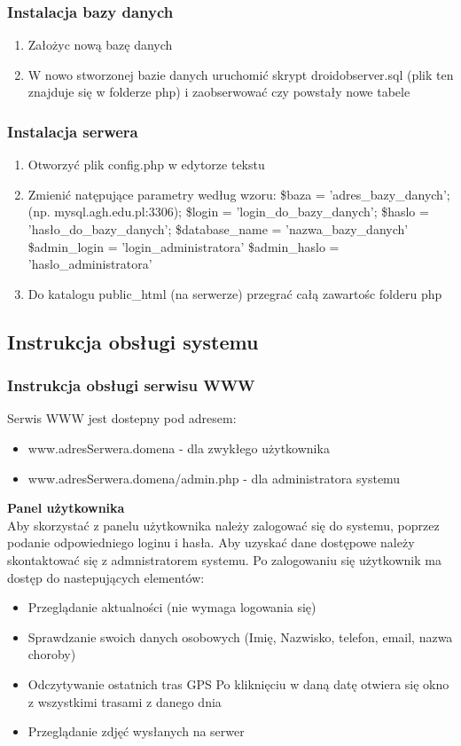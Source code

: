 \documentclass[11pt,a4paper]{article}
\begin{document}
\subsubsection{Instalacja bazy danych}
\begin{enumerate}
\item Założyc nową bazę danych
\item W nowo stworzonej bazie danych uruchomić skrypt droidobserver.sql (plik ten znajduje się w folderze php) i zaobserwować czy powstały nowe tabele
\end{enumerate}

\subsubsection{Instalacja serwera}
\begin{enumerate}
\item Otworzyć plik config.php w edytorze tekstu
\item Zmienić natępujące parametry według wzoru:
\subitem \$baza = 'adres\_bazy\_danych';  (np. mysql.agh.edu.pl:3306);
\subitem \$login = 'login\_do\_bazy\_danych'; 
\subitem \$haslo = 'hasło\_do\_bazy\_danych';
\subitem \$database\_name = 'nazwa\_bazy\_danych'
\subitem \$admin\_login = 'login\_administratora'
\subitem \$admin\_haslo = 'haslo\_administratora'
\item Do katalogu public\_html (na serwerze) przegrać całą zawartośc folderu php
\end{enumerate}

\subsection{Instrukcja obsługi systemu}
\subsubsection{Instrukcja obsługi serwisu WWW}

Serwis WWW jest dostepny pod adresem:
\begin{itemize}
\item www.adresSerwera.domena - dla zwykłego użytkownika 
\item www.adresSerwera.domena/admin.php - dla administratora systemu
\end{itemize}

{\bf Panel użytkownika}\\
Aby skorzystać z panelu użytkownika należy zalogować się do systemu, poprzez podanie odpowiedniego loginu i hasła.
Aby uzyskać dane dostępowe należy skontaktować się z admnistratorem systemu.
Po zalogowaniu się użytkownik ma dostęp do nastepujących elementów:
\begin{itemize}
\item Przeglądanie aktualności (nie wymaga logowania się)
\item Sprawdzanie swoich danych osobowych (Imię, Nazwisko, telefon, email, nazwa choroby)
\item Odczytywanie ostatnich tras GPS 
\subitem Po kliknięciu w daną datę otwiera się okno z wszystkimi trasami z danego dnia
\item Przeglądanie zdjęć wysłanych na serwer
\end{itemize}
\end{document}
